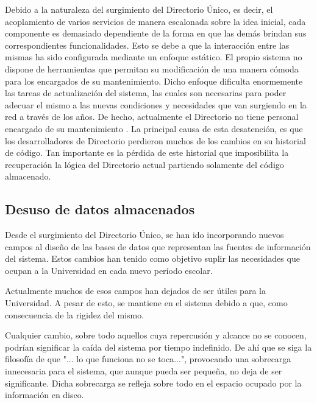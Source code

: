 Debido a la naturaleza del surgimiento del Directorio Único, es decir, el acoplamiento 
de varios servicios de manera escalonada sobre la idea inicial, cada componente es 
demasiado dependiente de la forma en que las demás brindan sus correspondientes 
funcionalidades. Esto se debe a que la interacción entre las mismas ha sido configurada 
mediante un enfoque estático. El propio sistema no dispone de herramientas que permitan su 
modificación de una manera cómoda para los encargados de su mantenimiento. Dicho enfoque 
dificulta enormemente las tareas de actualización del sistema, las cuales son necesarias 
para poder adecuar el mismo a las nuevas condiciones y necesidades que van surgiendo en la 
red a través de los años. De hecho, actualmente el Directorio no tiene personal encargado
de su mantenimiento  . La principal causa de esta desatención, es que los desarrolladores 
de Directorio perdieron muchos de los cambios en su historial de código. Tan importante es
la pérdida de este historial que imposibilita la recuperación la lógica del Directorio 
actual partiendo solamente del código almacenado.

\subsection{Desuso de datos almacenados}

Desde el surgimiento del Directorio Único, se han ido incorporando nuevos campos al 
diseño de las bases de datos  que representan las fuentes de información del sistema. 
Estos cambios han tenido como objetivo suplir las necesidades que ocupan a la Universidad 
en cada nuevo período escolar. 

Actualmente muchos de esos campos han dejados de ser útiles para la Universidad.
A pesar de esto, se mantiene en el sistema debido a que, como consecuencia de la rigidez 
del mismo.  

Cualquier cambio, sobre todo aquellos cuya repercusión y alcance no se conocen, podrían 
significar la caída del sistema por tiempo indefinido. De ahí que se siga la filosofía de que 
"... lo que funciona no se toca...", provocando una sobrecarga innecesaria para el 
sistema, que aunque pueda ser pequeña, no deja de ser significante. Dicha sobrecarga se
refleja sobre todo en el espacio ocupado por la información en disco. 

